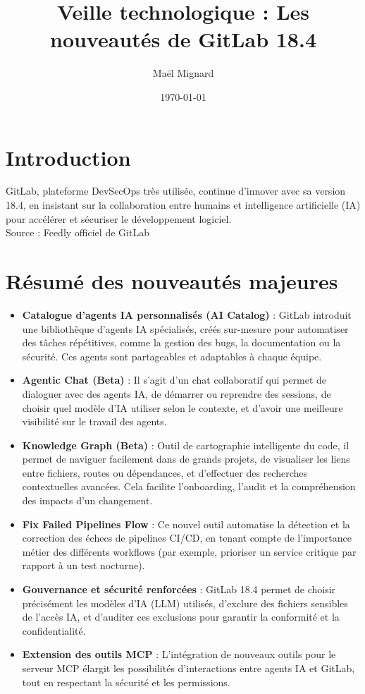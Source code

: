 \documentclass[12pt,a4paper]{article}
\title{Veille technologique : Les nouveautés de GitLab 18.4}
\author{Maël Mignard}
\date{\today}
\begin{document}
\maketitle


\section*{Introduction}
GitLab, plateforme DevSecOps très utilisée, continue d’innover avec sa version 18.4, en insistant sur la collaboration entre humains et intelligence artificielle (IA) pour accélérer et sécuriser le développement logiciel. \\

 Source : Feedly officiel de GitLab

\section*{Résumé des nouveautés majeures}
\begin{itemize}
  \item \textbf{Catalogue d’agents IA personnalisés (AI Catalog)} : GitLab introduit une bibliothèque d’agents IA spécialisés, créés sur-mesure pour automatiser des tâches répétitives, comme la gestion des bugs, la documentation ou la sécurité. Ces agents sont partageables et adaptables à chaque équipe.
    \item \textbf{Agentic Chat (Beta)} : Il s’agit d’un chat collaboratif qui permet de dialoguer avec des agents IA, de démarrer ou reprendre des sessions, de choisir quel modèle d’IA utiliser selon le contexte, et d’avoir une meilleure visibilité sur le travail des agents.
    \item \textbf{Knowledge Graph (Beta)} : Outil de cartographie intelligente du code, il permet de naviguer facilement dans de grands projets, de visualiser les liens entre fichiers, routes ou dépendances, et d’effectuer des recherches contextuelles avancées. Cela facilite l’onboarding, l’audit et la compréhension des impacts d’un changement.
    \item \textbf{Fix Failed Pipelines Flow} : Ce nouvel outil automatise la détection et la correction des échecs de pipelines CI/CD, en tenant compte de l’importance métier des différents workflows (par exemple, prioriser un service critique par rapport à un test nocturne).
    \item \textbf{Gouvernance et sécurité renforcées} : GitLab 18.4 permet de choisir précisément les modèles d’IA (LLM) utilisés, d’exclure des fichiers sensibles de l’accès IA, et d’auditer ces exclusions pour garantir la conformité et la confidentialité.
    \item \textbf{Extension des outils MCP} : L’intégration de nouveaux outils pour le serveur MCP élargit les possibilités d’interactions entre agents IA et GitLab, tout en respectant la sécurité et les permissions.
\end{itemize}
\clearpage
\end{document}
